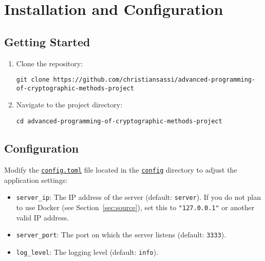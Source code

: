 \chapter{Installation and Configuration}
\label{cha:Installation}

\section{Getting Started}

\begin{enumerate}
    \item Clone the repository:

        \begin{lstlisting}
git clone https://github.com/christiansassi/advanced-programming-of-cryptographic-methods-project
        \end{lstlisting}

    \item Navigate to the project directory:
    
        \begin{lstlisting}
cd advanced-programming-of-cryptographic-methods-project
        \end{lstlisting}
\end{enumerate}

\section{Configuration}

Modify the \href{https://github.com/christiansassi/advanced-programming-of-cryptographic-methods-project/blob/main/config/config.toml}{\texttt{config.toml}} file located in the \href{https://github.com/christiansassi/advanced-programming-of-cryptographic-methods-project/blob/main/config}{\texttt{config}} directory to adjust the application settings:

\begin{itemize}
    \item \texttt{server\_ip}: The IP address of the server (default: \texttt{server}). If you do not plan to use Docker (see Section~\ref{sec:source}), set this to \texttt{"127.0.0.1"} or another valid IP address.
    \item \texttt{server\_port}: The port on which the server listens (default: \texttt{3333}).
    \item \texttt{log\_level}: The logging level (default: \texttt{info}).
\end{itemize}

